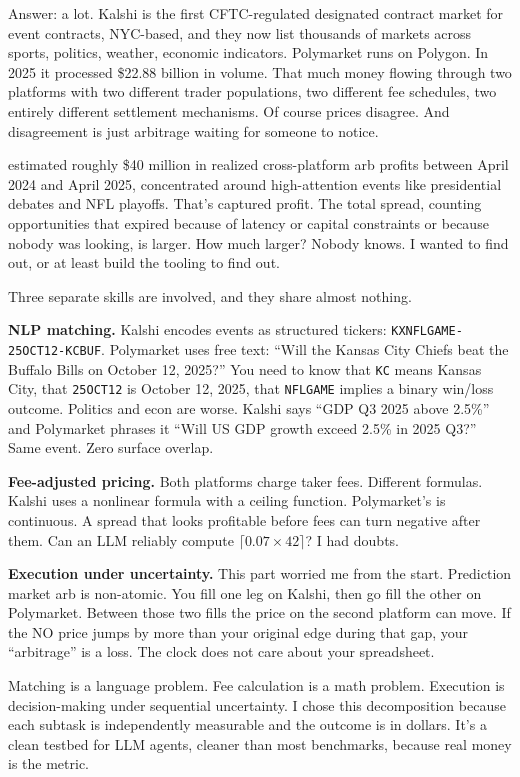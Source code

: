 \documentclass[11pt]{article}
\theoremstyle{definition}
\theoremstyle{remark}
\begin{document}
Answer: a lot. Kalshi is the first CFTC-regulated designated contract market for event contracts, NYC-based, and they now list thousands of markets across sports, politics, weather, economic indicators. Polymarket runs on Polygon. In 2025 it processed \$22.88 billion in volume. That much money flowing through two platforms with two different trader populations, two different fee schedules, two entirely different settlement mechanisms. Of course prices disagree. And disagreement is just arbitrage waiting for someone to notice.

\citet{saguillo2025arbitrage} estimated roughly \$40 million in realized cross-platform arb profits between April 2024 and April 2025, concentrated around high-attention events like presidential debates and NFL playoffs. That's captured profit. The total spread, counting opportunities that expired because of latency or capital constraints or because nobody was looking, is larger. How much larger? Nobody knows. I wanted to find out, or at least build the tooling to find out.

Three separate skills are involved, and they share almost nothing.

\textbf{NLP matching.} Kalshi encodes events as structured tickers: \texttt{KXNFLGAME-25OCT12-KCBUF}. Polymarket uses free text: ``Will the Kansas City Chiefs beat the Buffalo Bills on October 12, 2025?'' You need to know that \texttt{KC} means Kansas City, that \texttt{25OCT12} is October 12, 2025, that \texttt{NFLGAME} implies a binary win/loss outcome. Politics and econ are worse. Kalshi says ``GDP Q3 2025 above 2.5\%'' and Polymarket phrases it ``Will US GDP growth exceed 2.5\% in 2025 Q3?'' Same event. Zero surface overlap.

\textbf{Fee-adjusted pricing.} Both platforms charge taker fees. Different formulas. Kalshi uses a nonlinear formula with a ceiling function. Polymarket's is continuous. A spread that looks profitable before fees can turn negative after them. Can an LLM reliably compute $\lceil 0.07 \times 42 \rceil$? I had doubts.

\textbf{Execution under uncertainty.} This part worried me from the start. Prediction market arb is non-atomic. You fill one leg on Kalshi, then go fill the other on Polymarket. Between those two fills the price on the second platform can move. If the NO price jumps by more than your original edge during that gap, your ``arbitrage'' is a loss. The clock does not care about your spreadsheet.

Matching is a language problem. Fee calculation is a math problem. Execution is decision-making under sequential uncertainty. I chose this decomposition because each subtask is independently measurable and the outcome is in dollars. It's a clean testbed for LLM agents, cleaner than most benchmarks, because real money is the metric.
\end{document}
